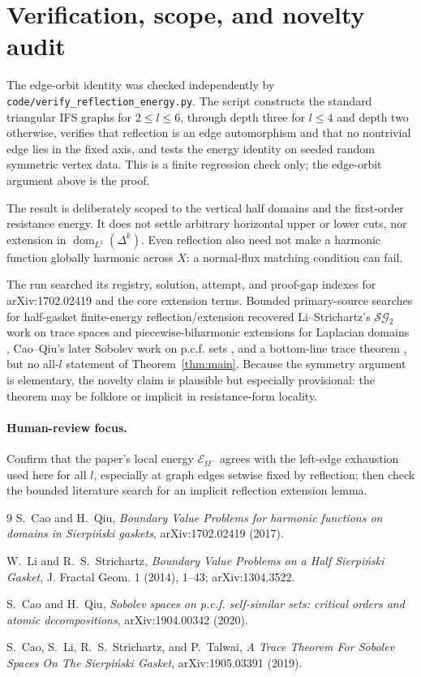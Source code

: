\documentclass[11pt]{article}
\newcommand{\SG}{\mathcal{SG}}
\newcommand{\E}{\mathcal E}
\begin{document}
\section{Verification, scope, and novelty audit}

The edge-orbit identity was checked independently by
\nolinkurl{code/verify_reflection_energy.py}.  The script constructs the
standard triangular IFS graphs for $2\leq l\leq6$, through depth three for
$l\leq4$ and depth two otherwise, verifies that reflection is an edge
automorphism and that no nontrivial edge lies in the fixed axis, and tests the
energy identity on seeded random symmetric vertex data.  This is a finite
regression check only; the edge-orbit argument above is the proof.

The result is deliberately scoped to the vertical half domains and the
first-order resistance energy.  It does not settle arbitrary horizontal upper
or lower cuts, nor extension in $\operatorname{dom}_{L^2}(\Delta^k)$.  Even
reflection also need not make a harmonic function globally harmonic across
$X$: a normal-flux matching condition can fail.

The run searched its registry, solution, attempt, and proof-gap indexes for
arXiv:1702.02419 and the core extension terms.  Bounded primary-source searches
for half-gasket finite-energy reflection/extension recovered Li--Strichartz's
$\SG_2$ work on trace spaces and piecewise-biharmonic extensions for Laplacian
domains \cite{LS}, Cao--Qiu's later Sobolev work on p.c.f. sets \cite{CQ20},
and a bottom-line trace theorem \cite{CLST}, but no all-$l$ statement of
Theorem~\ref{thm:main}.  Because the symmetry argument is elementary, the
novelty claim is plausible but especially provisional: the theorem may be
folklore or implicit in resistance-form locality.

\paragraph{Human-review focus.}
Confirm that the paper's local energy $\E_{\Omega^-}$ agrees with the left-edge
exhaustion used here for all $l$, especially at graph edges setwise fixed by
reflection; then check the bounded literature search for an implicit reflection
extension lemma.

\begin{thebibliography}{9}
S.~Cao and H.~Qiu,
\emph{Boundary Value Problems for harmonic functions on domains in Sierpi\'nski
gaskets}, arXiv:1702.02419 (2017).

W.~Li and R.~S.~Strichartz,
\emph{Boundary Value Problems on a Half Sierpi\'nski Gasket},
J. Fractal Geom. 1 (2014), 1--43; arXiv:1304.3522.

S.~Cao and H.~Qiu,
\emph{Sobolev spaces on p.c.f. self-similar sets: critical orders and atomic
decompositions}, arXiv:1904.00342 (2020).

S.~Cao, S.~Li, R.~S.~Strichartz, and P.~Talwai,
\emph{A Trace Theorem For Sobolev Spaces On The Sierpi\'nski Gasket},
arXiv:1905.03391 (2019).
\end{thebibliography}
\end{document}
